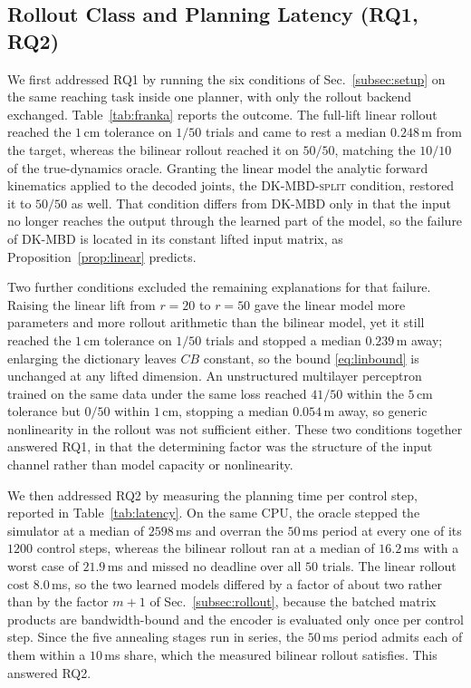 \documentclass[letterpaper,10pt,conference]{ieeeconf}
\newcommand{\dkmbd}{\textsc{DK-MBD}}
\newcommand{\dksplit}{\textsc{DK-MBD-split}}
\begin{document}
\subsection{Rollout Class and Planning Latency (RQ1, RQ2)}\label{subsec:exp_franka}

We first addressed RQ1 by running the six conditions of Sec.~\ref{subsec:setup} on the same reaching task inside one planner, with only the rollout backend exchanged.
Table~\ref{tab:franka} reports the outcome.
The full-lift linear rollout reached the $1$\,cm tolerance on $1/50$ trials and came to rest a median $0.248$\,m from the target, whereas the bilinear rollout reached it on $50/50$, matching the $10/10$ of the true-dynamics oracle.
Granting the linear model the analytic forward kinematics applied to the decoded joints, the \dksplit{} condition, restored it to $50/50$ as well.
That condition differs from \dkmbd{} only in that the input no longer reaches the output through the learned part of the model, so the failure of \dkmbd{} is located in its constant lifted input matrix, as Proposition~\ref{prop:linear} predicts.

Two further conditions excluded the remaining explanations for that failure.
Raising the linear lift from $r = 20$ to $r = 50$ gave the linear model more parameters and more rollout arithmetic than the bilinear model, yet it still reached the $1$\,cm tolerance on $1/50$ trials and stopped a median $0.239$\,m away; enlarging the dictionary leaves $CB$ constant, so the bound \eqref{eq:linbound} is unchanged at any lifted dimension.
An unstructured multilayer perceptron trained on the same data under the same loss reached $41/50$ within the $5$\,cm tolerance but $0/50$ within $1$\,cm, stopping a median $0.054$\,m away, so generic nonlinearity in the rollout was not sufficient either.
These two conditions together answered RQ1, in that the determining factor was the structure of the input channel rather than model capacity or nonlinearity.

We then addressed RQ2 by measuring the planning time per control step, reported in Table~\ref{tab:latency}.
On the same CPU, the oracle stepped the simulator at a median of $2598$\,ms and overran the $50$\,ms period at every one of its $1200$ control steps, whereas the bilinear rollout ran at a median of $16.2$\,ms with a worst case of $21.9$\,ms and missed no deadline over all $50$ trials.
The linear rollout cost $8.0$\,ms, so the two learned models differed by a factor of about two rather than by the factor $m+1$ of Sec.~\ref{subsec:rollout}, because the batched matrix products are bandwidth-bound and the encoder is evaluated only once per control step.
Since the five annealing stages run in series, the $50$\,ms period admits each of them within a $10$\,ms share, which the measured bilinear rollout satisfies.
This answered RQ2.
\end{document}

